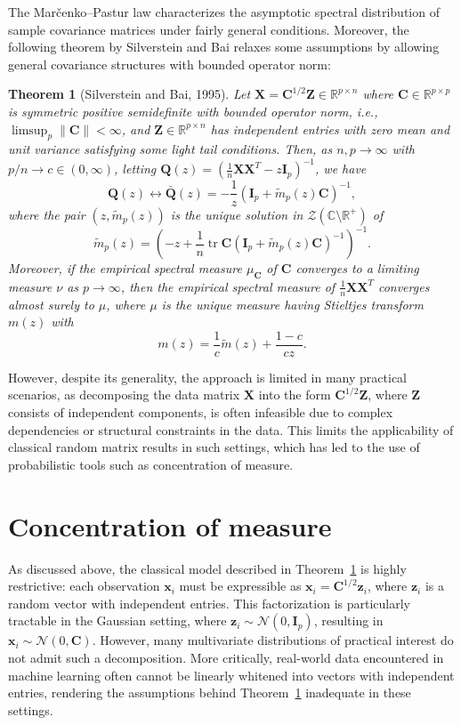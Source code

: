 \documentclass[12pt]{article}
\newtheorem{theorem}{Theorem}
\DeclareMathOperator{\tr}{tr}
\begin{document}
The Mar\v{c}enko--Pastur law characterizes the asymptotic spectral distribution of sample covariance matrices under fairly general conditions. Moreover, the following theorem by Silverstein and Bai relaxes some assumptions by allowing general covariance structures with bounded operator norm:
\begin{theorem}[Silverstein and Bai, 1995]\label{thm:silverstein-bai}
Let $\mathbf{X} = \mathbf{C}^{1/2} \mathbf{Z} \in \mathbb{R}^{p \times n}$
where $\mathbf{C} \in \mathbb{R}^{p \times p}$ is symmetric positive semidefinite with bounded operator norm, i.e., $\limsup_p \|\mathbf{C}\| < \infty$, and $\mathbf{Z} \in \mathbb{R}^{p \times n}$ has independent entries with zero mean and unit variance satisfying some light tail conditions. Then, as $n,p \to \infty$ with $p/n\to c \in (0, \infty)$, letting $\mathbf{Q}(z) = \left(\frac{1}{n} \mathbf{X} \mathbf{X}^T - z \mathbf{I}_p\right)^{-1}$, we have
$$
\mathbf{Q}(z) \leftrightarrow \bar{\mathbf{Q}}(z) = -\frac{1}{z} \left( \mathbf{I}_p + \tilde{m}_p(z) \mathbf{C} \right)^{-1},
$$
where the pair $(z, \tilde{m}_p(z))$ is the unique solution in $\mathcal{Z}(\mathbb{C} \setminus \mathbb{R}^+)$ of
$$
\tilde{m}_p(z) = \left( -z + \frac{1}{n} \tr \mathbf{C} \left( \mathbf{I}_p + \tilde{m}_p(z) \mathbf{C} \right)^{-1} \right)^{-1}.
$$
Moreover, if the empirical spectral measure $\mu_\mathbf{C}$ of $\mathbf{C}$ converges to a limiting measure $\nu$ as $p \to \infty$, then the empirical spectral measure of $\frac{1}{n} \mathbf{X} \mathbf{X}^T$ converges almost surely to $\mu$, where $\mu$ is the unique measure having Stieltjes transform $m(z)$ with
$$
m(z) = \frac{1}{c} \tilde{m}(z) +\frac{1-c}{cz}.
$$
\end{theorem}
However, despite its generality, the approach is limited in many practical scenarios, as decomposing the data matrix $\mathbf{X}$ into the form $\mathbf{C}^{1/2} \mathbf{Z}$, where $\mathbf{Z}$ consists of independent components, is often infeasible due to complex dependencies or structural constraints in the data. This limits the applicability of classical random matrix results in such settings, which has led to the use of probabilistic tools such as concentration of measure.

\section{Concentration of measure}
As discussed above, the classical model described in Theorem~\ref{thm:silverstein-bai} is highly restrictive: each observation $ \mathbf{x}_i $ must be expressible as $ \mathbf{x}_i = \mathbf{C}^{1/2} \mathbf{z}_i $, where $ \mathbf{z}_i $ is a random vector with independent entries. This factorization is particularly tractable in the Gaussian setting, where $ \mathbf{z}_i \sim \mathcal{N}(0, \mathbf{I}_p) $, resulting in $ \mathbf{x}_i \sim \mathcal{N}(0, \mathbf{C}) $. However, many multivariate distributions of practical interest do not admit such a decomposition. More critically, real-world data encountered in machine learning often cannot be linearly whitened into vectors with independent entries, rendering the assumptions behind Theorem~\ref{thm:silverstein-bai} inadequate in these settings.
\end{document}
